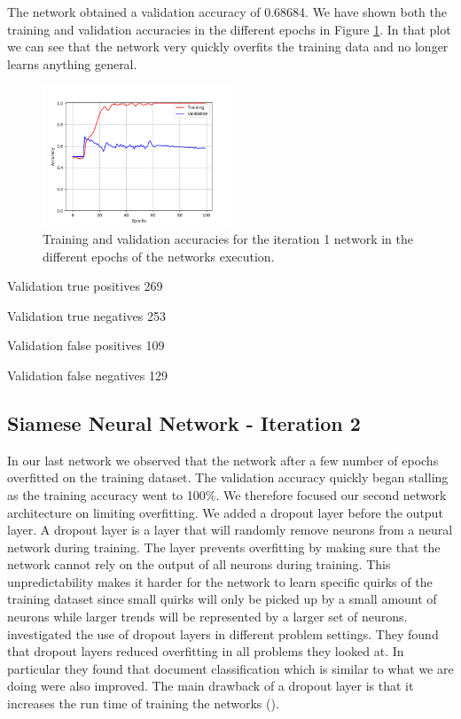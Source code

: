 The network obtained a validation accuracy of 0.68684. We have shown both the
training and validation accuracies in the different epochs in Figure
\ref{fig:network1_accuracies}. In that plot we can see that the network very
quickly overfits the training data and no longer learns anything general.

\begin{figure}[htb]
    \centering
    \includegraphics[width=0.5\textwidth]{./graphs/method/network_1_accuracies.png}
    \caption{Training and validation accuracies for the iteration 1 network in the different epochs of the
        networks execution.}
    \label{fig:network1_accuracies}
\end{figure}

Validation true positives 269

Validation true negatives 253

Validation false positives 109

Validation false negatives 129


\subsection{Siamese Neural Network - Iteration 2}


In our last network we observed that the network after a few number of epochs
overfitted on the training dataset. The validation accuracy quickly began
stalling as the training accuracy went to 100\%. We therefore focused our
second network architecture on limiting overfitting. We added a dropout layer
before the output layer. A dropout layer is a layer that will randomly remove
neurons from a neural network during training. The layer prevents overfitting
by making sure that the network cannot rely on the output of all neurons during
training. This unpredictability makes it harder for the network to learn
specific quirks of the training dataset since small quirks will only be picked
up by a small amount of neurons while larger trends will be represented by a
larger set of neurons. \cite{JMLR:v15:srivastava14a} investigated the use of
dropout layers in different problem settings. They found that dropout layers
reduced overfitting in all problems they looked at. In particular they found
that document classification which is similar to what we are doing were also
improved. The main drawback of a dropout layer is that it increases the run time
of training the networks (\cite{JMLR:v15:srivastava14a}).

